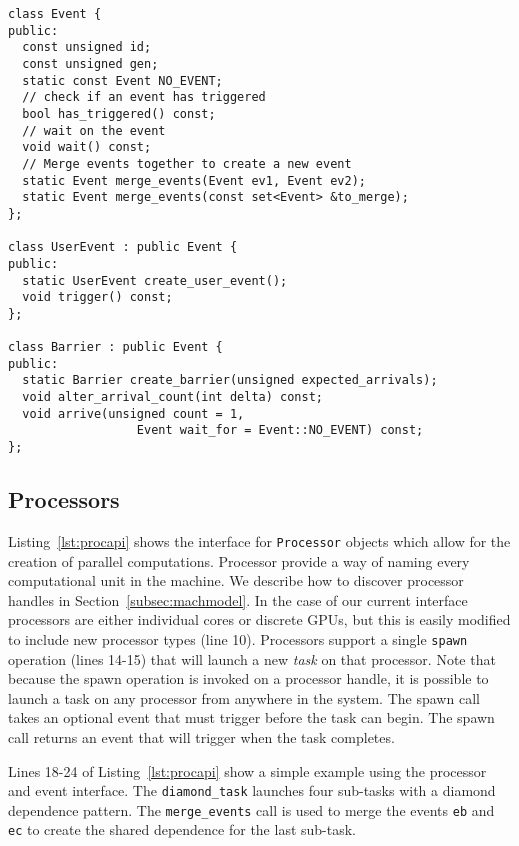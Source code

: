 \begin{lstlisting}[float={t},label={lst:eventapi},caption={Event Interface.}]
class Event {
public:
  const unsigned id;
  const unsigned gen;
  static const Event NO_EVENT;
  // check if an event has triggered
  bool has_triggered() const;
  // wait on the event
  void wait() const;
  // Merge events together to create a new event
  static Event merge_events(Event ev1, Event ev2);
  static Event merge_events(const set<Event> &to_merge);
};

class UserEvent : public Event {
public:
  static UserEvent create_user_event();
  void trigger() const;
};

class Barrier : public Event {
public:
  static Barrier create_barrier(unsigned expected_arrivals);
  void alter_arrival_count(int delta) const;
  void arrive(unsigned count = 1,
                  Event wait_for = Event::NO_EVENT) const;
};
\end{lstlisting}

\subsection{Processors}
\label{subsec:procs}
Listing~\ref{lst:procapi} shows the interface for {\tt Processor} objects which allow for
the creation of parallel computations.  Processor provide a way of naming 
every computational unit in the machine.  We describe how to discover processor handles
in Section~\ref{subsec:machmodel}.  In the case of our current interface 
processors are either individual cores or discrete GPUs, but this is easily modified 
to include new processor types (line 10).   Processors support a single {\tt spawn}
operation (lines 14-15) that will launch a new {\em task} on that processor.
Note that because the spawn operation
is invoked on a processor handle, it is possible to launch a task on any
processor from anywhere in the system.  
The spawn call takes an optional event that must trigger before the task can begin.  
The spawn call returns an event that will trigger when the task completes.

Lines 18-24 of Listing~\ref{lst:procapi} show a simple example using 
the processor and event interface.  The {\tt diamond\_task} launches four
sub-tasks with a diamond dependence pattern.  The {\tt merge\_events} call
is used to merge the events {\tt eb} and {\tt ec} to create the shared dependence
for the last sub-task.

